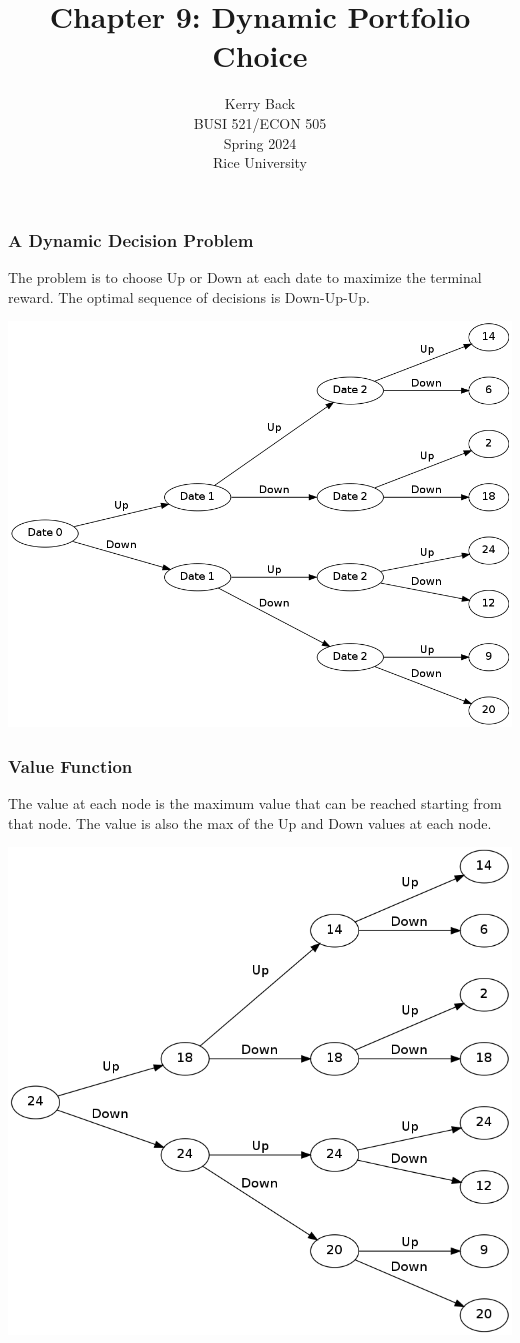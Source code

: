 \documentclass[10pt]{beamer}
\title{Chapter 9: Dynamic Portfolio Choice}
\date{}
\author{Kerry Back\\ 
BUSI 521/ECON 505\\
Spring 2024\\
Rice University}
\newcommand{\bfr}{\begin{frame}}
\begin{document}
\maketitle

\bfr\frametitle{A Dynamic Decision Problem}
The problem is to choose Up or Down at each date to maximize the terminal reward.  The optimal sequence of decisions is Down-Up-Up.
\begin{center}
\includegraphics[scale=.2]{images/fig9_1.png}
\end{center}

\end{frame}

\bfr\frametitle{Value Function}
The value at each node is the maximum value that can be reached starting from that node.  The value is also the max of the Up and Down values at each node.
\begin{center}
\includegraphics[scale=.2]{images/fig9_2.png}
\end{center}
\end{frame}
\end{document}
